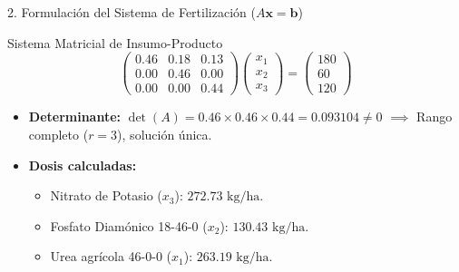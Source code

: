 \documentclass[
  spanish,
  aspectratio=169,
  xcolor={dvipsnames,table}
]{beamer}
\begin{document}
\begin{frame}{2. Formulación del Sistema de Fertilización ($A\mathbf{x}=\mathbf{b}$)}
  \begin{block}{Sistema Matricial de Insumo-Producto}
    $$\begin{pmatrix}
        0.46 & 0.18 & 0.13 \\
        0.00 & 0.46 & 0.00 \\
        0.00 & 0.00 & 0.44
    \end{pmatrix}
    \begin{pmatrix} x_1 \\ x_2 \\ x_3 \end{pmatrix}
    =
    \begin{pmatrix} 180 \\ 60 \\ 120 \end{pmatrix}$$
  \end{block}
  \begin{itemize}
    \item \textbf{Determinante:} $\det(A) = 0.46 \times 0.46 \times 0.44 = 0.093104 \neq 0$ $\implies$ Rango completo ($r=3$), solución única.
    \item \textbf{Dosis calculadas:}
      \begin{itemize}
        \item Nitrato de Potasio ($x_3$): $272.73\text{ kg/ha}$.
        \item Fosfato Diamónico 18-46-0 ($x_2$): $130.43\text{ kg/ha}$.
        \item Urea agrícola 46-0-0 ($x_1$): $263.19\text{ kg/ha}$.
      \end{itemize}
  \end{itemize}
\end{frame}
\end{document}
